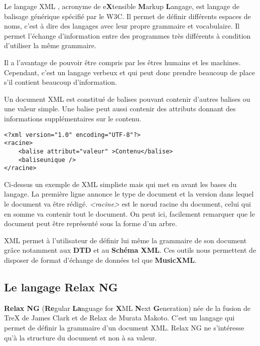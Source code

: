 Le langage XML \cite{xml_w3c, xml_ocr}, acronyme de e\textbf{X}tensible \textbf{M}arkup \textbf{L}angage, est langage de balisage générique spécifié par le W3C. Il permet de définir différents espaces de noms, c'est à dire des langages avec leur propre grammaire et vocabulaire. Il permet l'échange d'information entre des programmes très différents à condition d'utiliser la même grammaire.

\par
Il a l'avantage de pouvoir être compris par les êtres humains et les machines. Cependant, c'est un langage verbeux et qui peut donc prendre beaucoup de place s'il contient beaucoup d'information.

\par
Un document XML est constitué de balises pouvant contenir d'autres balises ou une valeur simple. Une balise peut aussi contenir des attributs donnant des informations supplémentaires sur le contenu.

\begin{lstlisting}[caption=Exemple d'un document XML]
<?xml version="1.0" encoding="UTF-8"?>
<racine>
    <balise attribut="valeur" >Contenu</balise>
    <baliseunique />
</racine>
\end{lstlisting}

\par
Ci-dessus un exemple de XML simpliste mais qui met en avant les bases du langage. La première ligne annonce le type de document et la version dans lequel le document va être rédigé. \emph{<racine>} est le nœud racine du document, celui qui en somme va contenir tout le document. On peut ici, facilement remarquer que le document peut être représenté sous la forme d'un arbre.

\par
XML permet à l'utilisateur de définir lui même la grammaire de son document grâce notamment aux \textbf{DTD} et au \textbf{Schéma XML}. Ces outils nous permettent de disposer de format d’échange de données tel que \textbf{MusicXML}.


\subsection{Le langage Relax NG}

\textbf{Relax NG} (\textbf{Re}gular \textbf{La}nguage for \textbf{X}ML \textbf{N}ext \textbf{G}eneration) née de la fusion de TreX de James Clark et de Relax de Murata Makoto. C'est un langage qui permet de définir la grammaire d'un document XML. Relax NG ne s'intéresse qu'à la structure du document et non à sa valeur.

